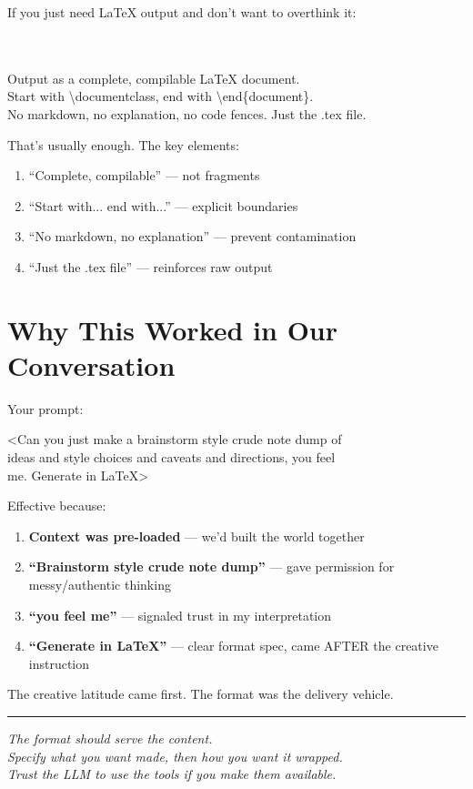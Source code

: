 \documentclass[11pt,letterpaper]{article}
\begin{document}
If you just need LaTeX output and don't want to overthink it:

\begin{tcolorbox}\\
\\
Output as a complete, compilable LaTeX document. \\
Start with \textbackslash documentclass, end with \textbackslash end\{document\}. \\
No markdown, no explanation, no code fences. Just the .tex file.
\end{tcolorbox}

That's usually enough. The key elements:

\begin{enumerate}
    \item ``Complete, compilable'' --- not fragments
    \item ``Start with... end with...'' --- explicit boundaries
    \item ``No markdown, no explanation'' --- prevent contamination
    \item ``Just the .tex file'' --- reinforces raw output
\end{enumerate}

\section{Why This Worked in Our Conversation}

Your prompt:

\begin{tcolorbox}[promptbox]
<Can you just make a brainstorm style crude note dump of \\
ideas and style choices and caveats and directions, you feel \\
me. Generate in LaTeX>
\end{tcolorbox}

Effective because:

\begin{enumerate}
    \item \textbf{Context was pre-loaded} --- we'd built the world together
    \item \textbf{``Brainstorm style crude note dump''} --- gave permission for messy/authentic thinking
    \item \textbf{``you feel me''} --- signaled trust in my interpretation
    \item \textbf{``Generate in LaTeX''} --- clear format spec, came AFTER the creative instruction
\end{enumerate}

The creative latitude came first. The format was the delivery vehicle.

\vspace{2em}
\hrule
\vspace{1em}

\begin{center}
\textit{The format should serve the content.}\\
\textit{Specify what you want made, then how you want it wrapped.}\\
\textit{Trust the LLM to use the tools if you make them available.}
\end{center}
\end{document}
